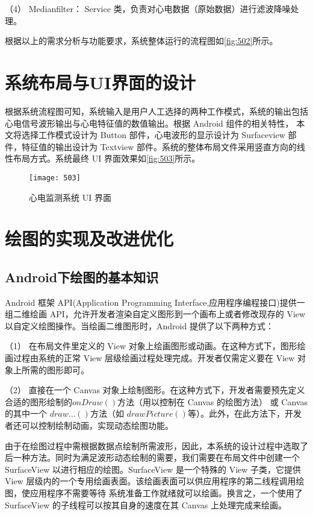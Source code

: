 （4）	Medianfilter： Service 类，负责对心电数据（原始数据）进行滤波降噪处理。 

根据以上的需求分析与功能要求，系统整体运行的流程图如\autoref{fig:502}所示。 

\section{系统布局与UI界面的设计}
根据系统流程图可知，系统输入是用户人工选择的两种工作模式，系统的输出包括心电信号波形输出与心电特征值的数值输出。根据 Android 组件的相关特性，
本文将选择工作模式设计为 Button 部件，心电波形的显示设计为 Surfaceview 部件，特征值的输出设计为 Textview 部件。系统的整体布局文件采用竖直方向的线性布局方式。系统最终
UI 界面效果如\autoref{fig:503}所示。 
\begin{figure}[htbp]
    \centering
    \texttt{[image: 503]}
    \caption{\label{fig:503} 心电监测系统 UI 界面}
\end{figure}

\section{绘图的实现及改进优化}
\subsection{Android下绘图的基本知识} 
Android 框架 API(Application Programming Interface,应用程序编程接口)提供一组二维绘画 API，允许开发者渲染自定义图形到一个画布上或者修改现存的 
View 以自定义绘图操作\cite{27}。当绘画二维图形时，Android 提供了以下两种方式： 

（1）	在布局文件里定义的 View 对象上绘画图形或动画。在这种方式下，图形绘画过程由系统的正常 View 层级绘画过程处理完成。开发者仅需定义要在 View 对象上所需的图形即可。 

（2）	直接在一个 Canvas 对象上绘制图形。在这种方式下，开发者需要预先定义合适的图形绘制的$onDraw()$方法（用以控制在 Canvas 的绘图方法）
或 Canvas 的其中一个 $draw...()$方法（如 $drawPicture()$等）。此外，在此方法下，开发者还可以控制绘制动画，实现动态绘图功能。  

由于在绘图过程中需根据数据点绘制所需波形，因此，本系统的设计过程中选取了后一种方法。同时为满足波形动态绘制的需要，我们需要在布局文件中创建一个 SurfaceView 
以进行相应的绘图。SurfaceView 是一个特殊的 View 子类，它提供 View 层级内的一个专用绘画表面。该绘画表面可以供应用程序的第二线程调用绘图，使应用程序不需要等待
系统准备工作就绪就可以绘画。换言之，一个使用了 SurfaceView 的子线程可以按其自身的速度在其 Canvas 上处理完成来绘画。 

